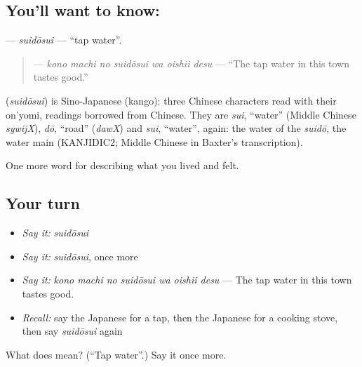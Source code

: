 \subsection*{You'll want to know: }
\textbf{} — \emph{suidōsui} — \textquotedblleft{}tap water\textquotedblright{}.

\begin{quote}
\textbf{   } — \emph{kono machi no suidōsui wa oishii desu} — \textquotedblleft{}The tap water in this town tastes good.\textquotedblright{}
\end{quote}

\begin{cousinweb}
\textbf{} (\emph{suidōsui}) is Sino-Japanese (kango): three Chinese characters read with their on'yomi, readings borrowed from Chinese. They are \emph{sui}, \textquotedblleft{}water\textquotedblright{} (Middle Chinese \emph{sywijX}), \emph{dō}, \textquotedblleft{}road\textquotedblright{} (\emph{dawX}) and \emph{sui}, \textquotedblleft{}water\textquotedblright{}, again: the water of the \emph{suidō}, the water main (KANJIDIC2; Middle Chinese in Baxter's transcription).
\end{cousinweb}

\begin{grammarlens}[title={What you've built}]
One more word for describing what you lived and felt.
\end{grammarlens}

\subsection*{Your turn}
\begin{itemize}
\raggedright
  \item \emph{Say it:} \emph{suidōsui}
  \item \emph{Say it:} \emph{suidōsui}, once more
  \item \emph{Say it:} \emph{kono machi no suidōsui wa oishii desu} — The tap water in this town tastes good.
  \item \emph{Recall:} say the Japanese for a tap, then the Japanese for a cooking stove, then say \emph{suidōsui} again
\end{itemize}

\begin{tcolorbox}[breakable,colback=teal!4,colframe=teal!35!black,title={Before you move on}]
What does  mean? (\textquotedblleft{}Tap water\textquotedblright{}.) Say it once more.
\end{tcolorbox}

